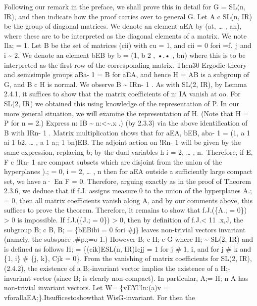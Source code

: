 \documentclass[
]{article}
\begin{document}
 Following our remark in the preface, we shall
prove this in detail for G = SL(n, IR), and then indicate how the proof
carries over to general G. Let A c SL(n, IR) be the group of diagonal
matrices. We denote an element aEA by (at, \ldots{} , an), where these
are to be interpreted as the diagonal elements of a matrix. We note Ila;
= 1. Let B be the set of matrices (cii) with cu = 1, and cii = 0 fori
=f.~j and i \textasciitilde{} 2. We denote an element bEB by b = (1, b 2
, •.• , bn) where this is to be interpreted as the first row of the
corresponding matrix. Then30 Ergodic theory and semisimple groups aBa- 1
= B for aEA, and hence H = AB is a subgroup of G, and B c H is normal.
We observe B \textasciitilde{} IRn- 1 . As with SL(2, IR), by Lemma
2.4.1, it suffices to show that the matrix coefficients of n: IA vanish
at oo. For SL(2, IR) we obtained this using knowledge of the
representation of P. In our more general situation, we will examine the
representation of H. (Note that H = P for n = 2.) Express n: IB
\textasciitilde{} n:\textless\textasciitilde.x .) (by 2.3.3) via the
above identification of B with IRn- 1 . Matrix multiplication shows that
for aEA, bEB, aba- 1 = (1, a 1 ai 1 b2, \ldots{} , a 1 a;; 1 bn)EB. The
adjoint action on !Rn- 1 will be given by the same expression, replacing
b; by the dual variables h i = 2, \ldots{} , n.~Therefore, if E, F c
!Rn- 1 are compact subsets which are disjoint from the union of the
hyperplanes ).; = 0, i = 2, \ldots{} , n then for aEA outside a
sufficiently large compact set, we have a· En F = 0. Therefore, arguing
exactly as in the proof of Theorem 2.3.6, we deduce that if f.J. assigns
measure 0 to the union of the hyperplanes A.; = 0, then all matrix
coefficients vanish along A, and by our comments above, this suffices to
prove the theorem. Therefore, it remains to show that f.J.(\{A.; = 0\})
\textgreater{} 0 is impossible. If f.J.(\{J.; = 0\}) \textgreater{} 0,
then by definition of f.J.\textless{} 11 .x,J, the subgroup B; c B, B; =
\{bEBibi = 0 fori \#j\} leaves non-trivial vectors invariant (namely,
the subspace .\#p.;=o 1.) However B; c H; c G where H; \textasciitilde{}
SL(2, IR) and is defined as follows H; = \{(cik)ESL(n, IR)Icjj = 1 for j
\# 1, i, and for j \# k and \{1, i\} \# \{j, k\}, Cjk = 0\}. From the
vanishing of matrix coefficients for SL(2, IR), (2.4.2), the existence
of a B;-invariant vector implies the existence of a H;-invariant vector
(since B; is clearly non-compact). In particular, A;= H; n A has
non-trivial invariant vectors. Let W= \{vEYl'ln:(a)v =
vforallaEA;\}.Itsufficestoshowthat WisG-invariant. For then the
\end{document}
